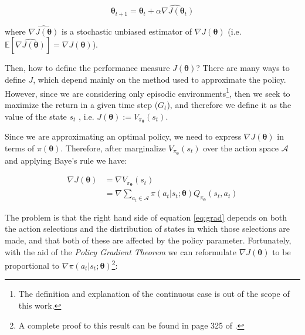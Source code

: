 \documentclass[twoside,twocolumn]{article}
\begin{document}
\begin{equation}
  \boldsymbol{\theta}_{t+1} = \boldsymbol{\theta}_{t} + \widehat{\alpha \nabla J(\boldsymbol{\theta}_t)}
  \label{eq:learn_rule}
\end{equation}

\noindent where $\widehat{\nabla J(\boldsymbol{\theta})}$ is a stochastic unbiased estimator of $\nabla J(\boldsymbol{\theta})$ (i.e. $\mathbb{E}[\widehat{\nabla J(\boldsymbol{\theta})}] = \nabla J(\boldsymbol{\theta})$).

Then, how to define the performance measure $J(\boldsymbol{\theta})$?
There are many ways to define $J$, which depend mainly on the method used to approximate the policy.
However, since we are considering only episodic environments\footnote{The definition and explanation of the continuous case is out of the scope of this work.}, then we seek to maximize the return in a given time step ($G_t$), and therefore we define it as the value of the state $s_t$ , i.e. $J(\boldsymbol{\theta}):=V_{\pi_{\boldsymbol{\theta}}}(s_t)$.

Since we are approximating an optimal policy, we need to express $\nabla J(\boldsymbol{\theta})$ in terms of $\pi(\boldsymbol{\theta})$. Therefore, after marginalize $V_{\pi_{\boldsymbol{\theta}}}(s_t)$ over the action space $\mathcal{A}$ and applying Baye's rule we have:

\begin{equation}
  \begin{split}
    \nabla J({\boldsymbol{\theta}}) &= \nabla V_{\pi_{\boldsymbol{\theta}}}(s_t)\\
    &= \nabla \sum_{a_t \in \mathcal{A}} \pi (a_t|s_t; \boldsymbol{\theta}) Q_{\pi_{\boldsymbol{\theta}}}(s_t,a_t)
  \end{split}
  \label{eq:grad}
\end{equation}

The problem is that the right hand side of equation \ref{eq:grad} depends on both the action selections and the distribution of states in which those selections are made, and that both of these are affected by the policy parameter. Fortunately, with the aid of the \emph{Policy Gradient Theorem} we can reformulate $\nabla J({\boldsymbol{\theta}})$ to be proportional to $\nabla \pi (a_t|s_t; \boldsymbol{\theta})$\footnote{A complete proof to this result can be found in page 325 of \cite{Sutton1998}.}:
\end{document}
